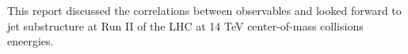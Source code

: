 This report discussed the correlations between observables and looked forward to jet substructure at Run II of the LHC at 14 TeV center-of-mass collisions eneergies.
